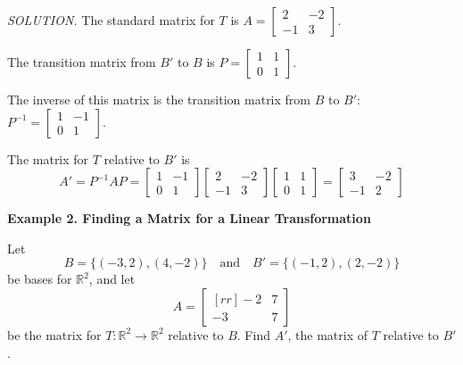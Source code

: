 \documentclass{article}
\newcommand\R{\mathbb{R}}
\begin{document}
    \textit{\textcolor{blue5}{SOLUTION.}} The standard matrix for $T$ is $A = \begin{bmatrix}
        2 & -2 \\
        -1 & 3
    \end{bmatrix}$.

    The transition matrix from $B'$ to $B$ is $P = \begin{bmatrix}
        1 & 1 \\
        0 & 1
    \end{bmatrix}$.
    
    The inverse of this matrix is the transition matrix from $B$ to $B'$: $P^{-1} = \begin{bmatrix}
        1 & -1 \\
        0 & 1
    \end{bmatrix}$.

    The matrix for $T$ relative to $B'$ is \[A' = P^{-1}AP = \begin{bmatrix}
        1 & -1 \\ 0 & 1
    \end{bmatrix} \begin{bmatrix}
        2 & -2 \\ -1 & 3
    \end{bmatrix} \begin{bmatrix}
        1 & 1 \\ 0 & 1
    \end{bmatrix} = \begin{bmatrix}
        3 & -2\\
        -1 & 2
    \end{bmatrix}\]

    \textbf{Example 2. \textcolor{blue5}{Finding a Matrix for a Linear Transformation}}

    Let 
    \[B = \{(-3, 2), (4, -2)\} \quad \text{and} \quad B' = \{(-1,2), (2,-2) \}\]
    be bases for $ \R^2 $, and let 
    \[A = \begin{bmatrix}[rr]
        -2 & 7 \\
        -3 & 7
    \end{bmatrix}\]
    be the matrix for $T: \R^2  \to  \R^2 $ relative to $B$. Find $A'$, the matrix of $T$ relative to $B'$.
\end{document}

